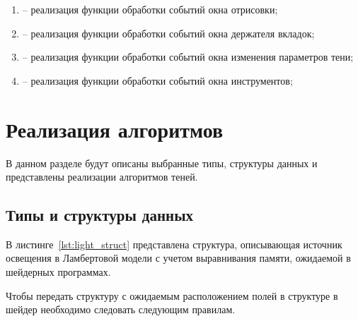 \begin{itemize}[label=---]
\begin{enumerate}[label=\arabic*), labelsep=0.5em]
        \item {} -- реализация функции обработки событий окна отрисовки;
        \item {} -- реализация функции обработки событий окна держателя вкладок;
        \item {} -- реализация функции обработки событий окна изменения параметров тени;
        \item {} -- реализация функции обработки событий окна инструментов;
    \end{enumerate}
\end{itemize}

\section{Реализация алгоритмов}

В данном разделе будут описаны выбранные типы, структуры данных и
представлены реализации алгоритмов теней.

\subsection{Типы и структуры данных}

В листинге~\ref{lst:light_struct} представлена структура, описывающая источник
освещения в Ламбертовой модели с учетом выравнивания памяти, ожидаемой в шейдерных
программах.

Чтобы передать структуру с ожидаемым расположением полей в структуре в шейдер 
необходимо следовать следующим правилам.

